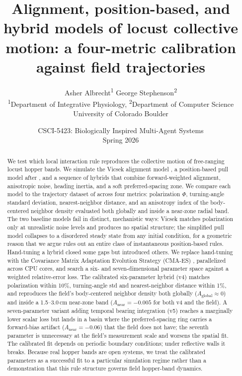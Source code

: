 \documentclass[11pt]{article}
\title{Alignment, position-based, and hybrid models of locust collective
motion: a four-metric calibration against field trajectories}
\author{Asher Albrecht\textsuperscript{1} \quad George Stephenson\textsuperscript{2} \\
\textsuperscript{1}Department of Integrative Physiology, \textsuperscript{2}Department of Computer Science \\
University of Colorado Boulder}
\date{CSCI-5423: Biologically Inspired Multi-Agent Systems \\ Spring 2026}
\begin{document}
\maketitle

\begin{abstract}
We test which local interaction rule reproduces the collective motion of
free-ranging locust hopper bands. We simulate the Vicsek alignment model
\citep{vicsek1995}, a position-based pull model after \citet{sayin2025},
and a sequence of hybrids that combine forward-weighted alignment,
anisotropic noise, heading inertia, and a soft preferred-spacing zone. We
compare each model to the trajectory dataset of \citet{weinburd2024}
across four metrics: polarization $\Phi$, turning-angle standard deviation,
nearest-neighbor distance, and an anisotropy index of the body-centered
neighbor density evaluated both globally and inside a near-zone radial
band. The two baseline models fail in distinct, mechanistic ways: Vicsek
matches polarization only at unrealistic noise levels and produces no
spatial structure; the simplified pull model collapses to a disordered
steady state from any initial condition, for a geometric reason that we
argue rules out an entire class of instantaneous position-based rules.
Hand-tuning a hybrid closed some gaps but introduced others. We replace
hand-tuning with the Covariance Matrix Adaptation Evolution Strategy
(CMA-ES) \citep{hansen2016}, parallelized across CPU cores, and search a
six- and seven-dimensional parameter space against a weighted
relative-error loss. The calibrated six-parameter hybrid (v4) matches
polarization within 10\%, turning-angle std and nearest-neighbor distance
within 1\%, and reproduces the field's body-centered neighbor density
both globally ($A_\text{global} \approx 0$) and inside a 1.5--3.0\,cm
near-zone band ($A_\text{near} = -0.005$ for both v4 and the field). A
seven-parameter variant adding temporal bearing integration (v5) reaches
a marginally lower scalar loss but lands in a basin where the
preferred-spacing ring carries a forward-bias artifact ($A_\text{near}
= -0.06$) that the field does not have; the seventh parameter is
unnecessary at the field's measurement scale and worsens the spatial
fit. The calibrated fit depends on periodic boundary conditions; under
reflective walls it breaks. Because real hopper bands are open systems,
we treat the calibrated parameters as a successful fit to a particular
simulation regime rather than a demonstration that this rule structure
governs field hopper-band dynamics.
\end{abstract}
\end{document}
